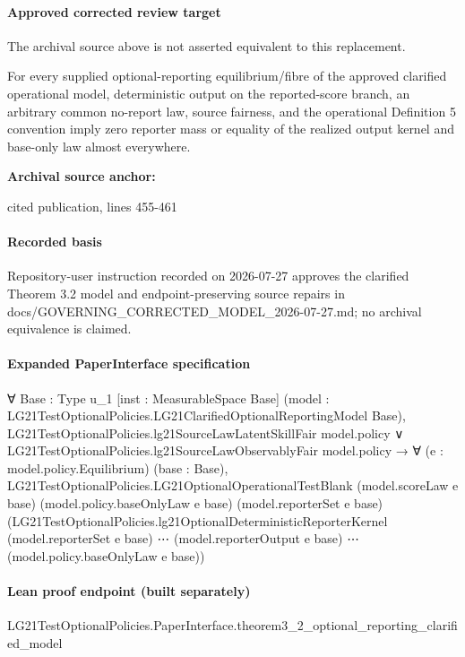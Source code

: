\documentclass[10pt]{article}
\begin{document}
\paragraph{Approved corrected review target}
The archival source above is not asserted equivalent to this replacement.
\begin{ReviewVerbatim}
For every supplied optional-reporting equilibrium/fibre of the approved clarified operational model, deterministic output on the reported-score branch, an arbitrary common no-report law, source fairness, and the operational Definition 5 convention imply zero reporter mass or equality of the realized output kernel and base-only law almost everywhere.
\end{ReviewVerbatim}

\textbf{Archival source anchor:} {\footnotesize\raggedright cited publication, lines 455-\allowbreak{}461\par}
\paragraph{Recorded basis}
Repository-\allowbreak{}user instruction recorded on 2026-\allowbreak{}07-\allowbreak{}27 approves the clarified Theorem 3.\allowbreak{}2 model and endpoint-\allowbreak{}preserving source repairs in docs/\allowbreak{}GOVERNING\_\allowbreak{}CORRECTED\_\allowbreak{}MODEL\_\allowbreak{}2026-\allowbreak{}07-\allowbreak{}27.\allowbreak{}md;\allowbreak{} no archival equivalence is claimed.\allowbreak{}
\paragraph{Expanded PaperInterface specification}
\begin{ReviewVerbatim}
∀ {Base : Type u_1} [inst : MeasurableSpace Base]
  (model : LG21TestOptionalPolicies.LG21ClarifiedOptionalReportingModel Base),
  LG21TestOptionalPolicies.lg21SourceLawLatentSkillFair model.policy ∨
      LG21TestOptionalPolicies.lg21SourceLawObservablyFair model.policy →
    ∀ (e : model.policy.Equilibrium) (base : Base),
      LG21TestOptionalPolicies.LG21OptionalOperationalTestBlank (model.scoreLaw e base)
        (model.policy.baseOnlyLaw e base) (model.reporterSet e base)
        (LG21TestOptionalPolicies.lg21OptionalDeterministicReporterKernel (model.reporterSet e base) ⋯
          (model.reporterOutput e base) ⋯ (model.policy.baseOnlyLaw e base))
\end{ReviewVerbatim}

\paragraph{Lean proof endpoint (built separately)}\begin{ReviewVerbatim}
LG21TestOptionalPolicies.PaperInterface.theorem3_2_optional_reporting_clarified_model
\end{ReviewVerbatim}
\end{document}
